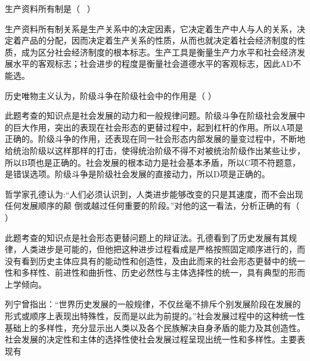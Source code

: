 \question 生产资料所有制是（ ~）
\par{}
\begin{solution}生产资料所有制关系是生产关系中的决定因素，它决定着生产中人与人的关系，决定着产品的分配，因而决定着生产关系的性质，从而也就决定着社会经济制度的性质，成为区分社会经济制度的根本标志。生产工具是衡量生产力水平和社会经济发展水平的客观标志；社会进步的程度是衡量社会道德水平的客观标志，因此AD不能选。
\end{solution}
\question 历史唯物主义认为，阶级斗争在阶级社会中的作用是（ ）
\par{}
\begin{solution}此题考查的知识点是社会发展的动力和一般规律问题。阶级斗争在阶级社会发展中的巨大作用，突出的表现在社会形态的更替过程中，起到杠杆的作用。所以A项是正确的。阶级斗争的作用，还表现在同一社会形态内部发展的量变过程中，不断地给统治阶级以这样那样的打击，使得统治阶级不得不对被统治阶级作出某些让步，所以B项也是正确的。社会发展的根本动力是社会基本矛盾，所以C项不符题意，是错误选项。阶级斗争是阶级社会发展的直接动力，所以D项是正确的。
\end{solution}
\question 哲学家孔德认为:``人们必须认识到，人类进步能够改变的只是其速度，而不会出现任何发展顺序的颠
倒或越过任何重要的阶段。''对他的这一看法，分析正确的有（ ）
\par{}
\begin{solution}此题考查的知识点是社会形态更替问题上的辩证法。孔德看到了历史发展有其规律，人类进步是可能的，但他把这种进步过程看成是严格按照固定顺序进行的，而没有看到历史主体应具有的能动性和创造性，及由此而来的社会形态更替中的统一性和多样性、前进性和曲折性、历史必然性与主体选择性的统一，具有典型的形而上学倾向。
\end{solution}
\question 列宁曾指出：``世界历史发展的一般规律，不仅丝毫不排斥个别发展阶段在发展的形式或顺序上表现出特殊性，反而是以此为前提的。''社会发展过程中的这种统一性基础上的多样性，充分显示出人类以及各个民族解决自身矛盾的能力及其创造性。社会发展的决定性和主体的选择性使社会发展过程呈现出统一性和多样性。主要表现有
\par\fourch{\textcolor{red}{从纵向看，表现为社会形态更替的统一性和多样性}}{\textcolor{red}{统一性是社会形态运动由低级到高级、由简单到复杂的过程，人类的总体历史过程表现为五种社会形态的依次更替}}{\textcolor{red}{多样性是指不同的民族可以超越一种或几种社会形态而跳跃式地向前发展}}{\textcolor{red}{从横向看，表现为同类社会形态既有共同的本质，又有各自的特点}}
